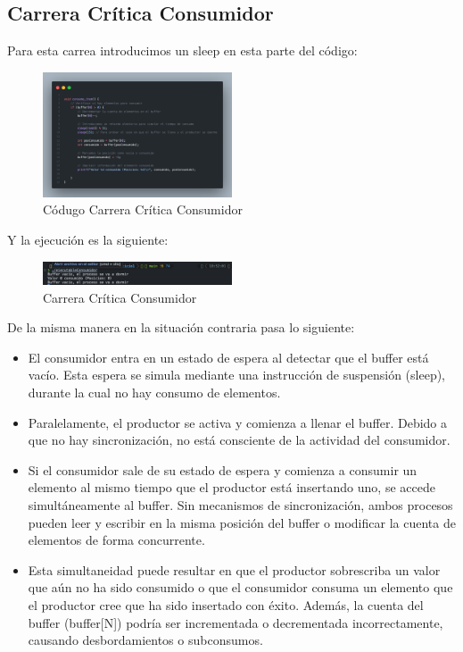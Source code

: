 \documentclass[twocolumn]{article}
\begin{document}
\subsection{Carrera Crítica Consumidor}

Para esta carrea introducimos un sleep en esta parte del código:

\begin{figure}[H]
    \centering
    \includegraphics[width=0.5\textwidth]{ejercicio1/consumidorSleep.png}
    \caption{Códugo Carrera Crítica Consumidor} 
    \label{fig:my_label}
\end{figure}

Y la ejecución es la siguiente:

\begin{figure}[H]
    \centering
    \includegraphics[width=0.5\textwidth]{ejercicio1/consumidorCarrera.jpg}
    \caption{Carrera Crítica Consumidor} 
    \label{fig:my_label}
\end{figure}

De la misma manera en la situación contraria pasa lo siguiente:

\begin{itemize}
    \item El consumidor entra en un estado de espera al detectar que el buffer está vacío. Esta espera se simula mediante una instrucción de suspensión (sleep), durante la cual no hay consumo de elementos.
    
    \item Paralelamente, el productor se activa y comienza a llenar el buffer. Debido a que no hay sincronización, no está consciente de la actividad del consumidor.
    
    \item Si el consumidor sale de su estado de espera y comienza a consumir un elemento al mismo tiempo que el productor está insertando uno, se accede simultáneamente al buffer. Sin mecanismos de sincronización, ambos procesos pueden leer y escribir en la misma posición del buffer o modificar la cuenta de elementos de forma concurrente.
    
    \item Esta simultaneidad puede resultar en que el productor sobrescriba un valor que aún no ha sido consumido o que el consumidor consuma un elemento que el productor cree que ha sido insertado con éxito. Además, la cuenta del buffer (buffer[N]) podría ser incrementada o decrementada incorrectamente, causando desbordamientos o subconsumos.
\end{itemize}
\end{document}
